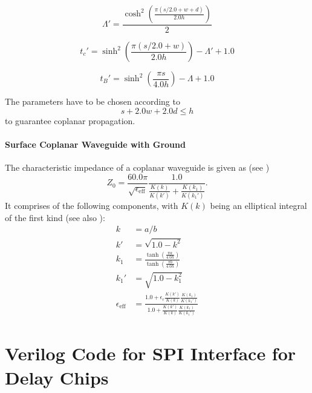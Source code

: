 \begin{equation}
	\Lambda' = \frac{\cosh^2 \left( \frac{\pi (s/2.0 + w + d)}{2.0 h} \right) }{2}
\end{equation}

\begin{equation}
	t_c' = \sinh^2 \left( \frac{\pi (s/2.0 + w)}{2.0 h} \right) - \Lambda' + 1.0
\end{equation}

\begin{equation}
	t_B' = \sinh^2 \left( \frac{\pi s}{4.0 h} \right) - \Lambda + 1.0
\end{equation}

The parameters have to be chosen according to 
\begin{equation}
	s + 2.0 w + 2.0 d \leq h
\end{equation}
to guarantee coplanar propagation. \cite{wadell}


\paragraph{Surface Coplanar Waveguide with Ground}  
The characteristic impedance of a coplanar waveguide is given as (see \cite{wadell}) 
\begin{equation}
	Z_0 = \frac{60.0 \pi}{\sqrt{\epsilon_\text{eff}}} \frac{1.0}{\frac{K(k)}{K(k')} + \frac{K(k_1)}{K(k_1')}}.
\end{equation}
It comprises of the following components, with $K(k)$ being an elliptical integral of the first kind (see also \cite[p.~430]{bronstein}):
\begin{align}
	k &= a/b\\
	k' &= \sqrt{1.0 - k^{2}}\\
	k_1 &= \frac{\tanh(\frac{\pi a}{4.0  h})}{\tanh(\frac{\pi  b}{4.0 h})}\\
	k_1' &= \sqrt{1.0 - k_1^{2}}\\
	\epsilon_\text{eff} &= \frac{1.0 + \epsilon_r \frac{K(k')}{K(k)} \frac{K(k_1)}{K(k_1')}}{1.0 + \frac{K(k')}{K(k)} \frac{K(k_1)}{K(k_1')}}
\end{align}

\section{Verilog Code for SPI Interface for Delay Chips} \label{app:code} %


